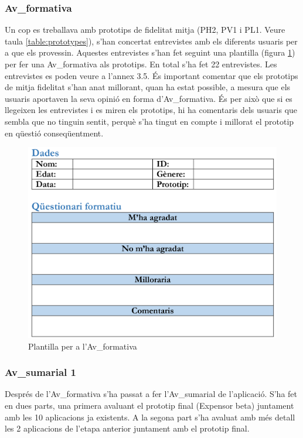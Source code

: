 \subsubsection{\Gls{Av_formativa}}
Un cop es treballava amb prototips de fidelitat mitja (PH2, PV1 i PL1. Veure taula \ref{table:prototypes}), s'han concertat entrevistes amb els diferents usuaris per a que els provessin. Aquestes entrevistes s'han fet seguint una plantilla (figura \ref{fig:qf}) per fer una \gls{Av_formativa} als prototips. En total s'ha fet 22 entrevistes. Les entrevistes es poden veure a l'annex 3.5.
És important comentar que els prototips de mitja fidelitat s'han anat millorant, quan ha estat possible, a mesura que els usuaris aportaven la seva opinió en forma d'\gls{Av_formativa}. És per això que si es llegeixen les entrevistes i es miren els prototips, hi ha comentaris dels usuaris que sembla que no tinguin sentit, perquè s'ha tingut en compte i millorat el prototip en qüestió conseqüentment. 

\begin{figure}[htp]
\centering
\includegraphics[scale=1]{qf.png}
\caption{Plantilla per a l'\gls{Av_formativa} }\label{fig:qf}
\end{figure}

\subsubsection{\Gls{Av_sumarial} 1}
Després de l'\gls{Av_formativa} s'ha passat a fer l'\gls{Av_sumarial} de l'aplicació. S'ha fet en dues parts, una primera avaluant  el prototip final (Expensor beta) juntament amb les 10 aplicacions ja existents. A la segona part s'ha avaluat amb més detall les 2 aplicacions de l'etapa anterior juntament amb el prototip final.

